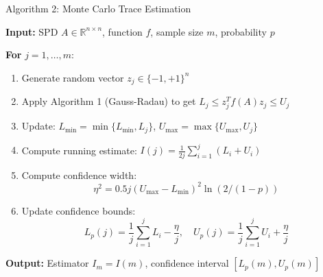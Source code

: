 \documentclass[aspectratio=169, 12pt]{beamer}
\begin{document}
\begin{frame}{Algorithm 2: Monte Carlo Trace Estimation}

\textbf{Input:} SPD \(A \in \mathbb{R}^{n \times n}\), function \(f\), sample size \(m\), probability \(p\)

\vspace{0.2cm}

\textbf{For} \(j = 1, \ldots, m\):
\begin{enumerate}
    \item Generate random vector \(z_j \in \{-1, +1\}^n\)
    \item Apply Algorithm 1 (Gauss-Radau) to get \(L_j \leq z_j^T f(A) z_j \leq U_j\)
    \item Update: \(L_{\min} = \min\{L_{\min}, L_j\}\), \(U_{\max} = \max\{U_{\max}, U_j\}\)
    \item Compute running estimate: \(I(j) = \frac{1}{2j} \sum_{i=1}^j (L_i + U_i)\)
    \item Compute confidence width:
    \[
    \eta^2 = 0.5j(U_{\max} - L_{\min})^2 \ln(2/(1-p))
    \]
    \item Update confidence bounds:
    \[
    L_p(j) = \frac{1}{j}\sum_{i=1}^j L_i - \frac{\eta}{j}, \quad U_p(j) = \frac{1}{j}\sum_{i=1}^j U_i + \frac{\eta}{j}
    \]
\end{enumerate}

\vspace{0.2cm}

\textbf{Output:} Estimator \(I_m = I(m)\), confidence interval \([L_p(m), U_p(m)]\)

\end{frame}
\end{document}
